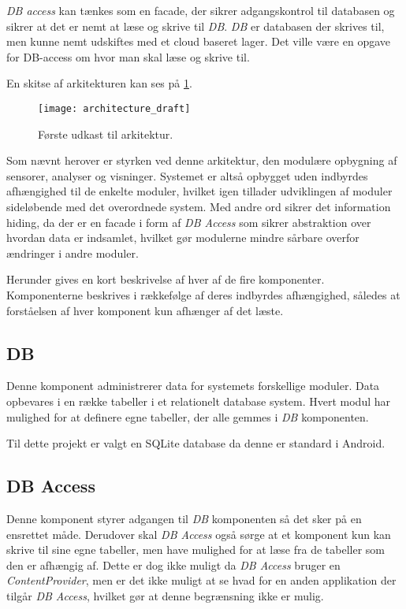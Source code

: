 \textit{DB access} kan tænkes som en facade, der sikrer adgangskontrol til databasen og sikrer at det er nemt at læse og skrive til \textit{DB}.
\textit{DB} er databasen der skrives til, men kunne nemt udskiftes med et cloud baseret lager. 
Det ville være en opgave for DB-access om hvor man skal læse og skrive til.

En skitse af arkitekturen kan ses på \cref{arkitektur_udkast_1}.
\begin{figure}[h]
	\centering
	\texttt{[image: architecture\_draft]}
	\caption{Første udkast til arkitektur.}
  \label{arkitektur_udkast_1}
\end{figure}
Som nævnt herover er styrken ved denne arkitektur, den modulære opbygning af sensorer, analyser og visninger.
Systemet er altså opbygget uden indbyrdes afhængighed til de enkelte moduler, hvilket igen tillader udviklingen af moduler sideløbende med det overordnede system.
Med andre ord sikrer det information hiding, da der er en facade i form af \textit{DB Access} som sikrer abstraktion over hvordan data er indsamlet, hvilket gør modulerne mindre sårbare overfor ændringer i andre moduler.

Herunder gives en kort beskrivelse af hver af de fire komponenter.
Komponenterne beskrives i rækkefølge af deres indbyrdes afhængighed, således at forståelsen af hver komponent kun afhænger af det læste.

\subsection*{DB}
Denne komponent administrerer data for systemets forskellige moduler.
Data opbevares i en række tabeller i et relationelt database system.
Hvert modul har mulighed for at definere egne tabeller, der alle gemmes i \textit{DB} komponenten.

Til dette projekt er valgt en SQLite database da denne er standard i Android.

\subsection*{DB Access}
Denne komponent styrer adgangen til \textit{DB} komponenten så det sker på en ensrettet måde.
Derudover skal \textit{DB Access} også sørge at et komponent kun kan skrive til sine egne tabeller, men have mulighed for at læse fra de tabeller som den er afhængig af.
Dette er dog ikke muligt da \textit{DB Access} bruger en \textit{ContentProvider}, men er det ikke muligt at se hvad for en anden applikation der tilgår \textit{DB Access}, hvilket gør at denne begrænsning ikke er mulig. 

